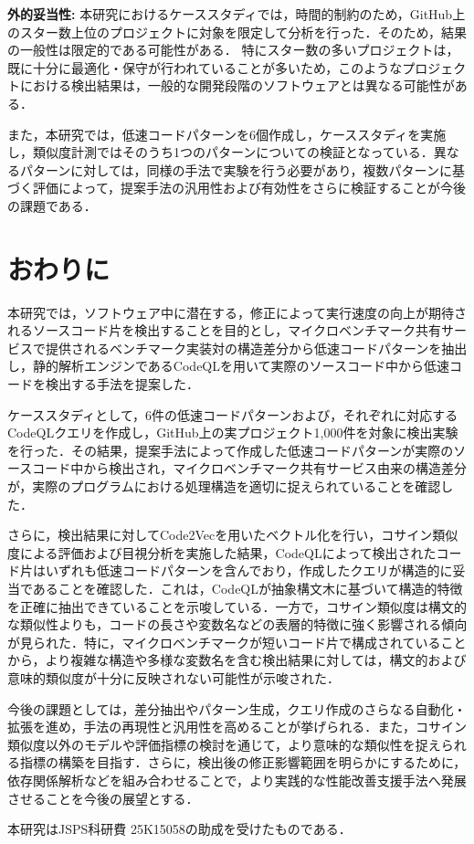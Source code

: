 \documentclass[submit,techrep,noauthor]{ipsj}
\begin{document}
\noindent\textbf{外的妥当性: }
本研究におけるケーススタディでは，時間的制約のため，GitHub上のスター数上位のプロジェクトに対象を限定して分析を行った．そのため，結果の一般性は限定的である可能性がある．
特にスター数の多いプロジェクトは，既に十分に最適化・保守が行われていることが多いため，このようなプロジェクトにおける検出結果は，一般的な開発段階のソフトウェアとは異なる可能性がある．

また，本研究では，低速コードパターンを6個作成し，ケーススタディを実施し，類似度計測ではそのうち1つのパターンについての検証となっている．異なるパターンに対しては，同様の手法で実験を行う必要があり，複数パターンに基づく評価によって，提案手法の汎用性および有効性をさらに検証することが今後の課題である．


\section{おわりに}
\label{sec:summary}

本研究では，ソフトウェア中に潜在する，修正によって実行速度の向上が期待されるソースコード片を検出することを目的とし，マイクロベンチマーク共有サービスで提供されるベンチマーク実装対の構造差分から低速コードパターンを抽出し，静的解析エンジンであるCodeQLを用いて実際のソースコード中から低速コードを検出する手法を提案した．

ケーススタディとして，6件の低速コードパターンおよび，それぞれに対応するCodeQLクエリを作成し，GitHub上の実プロジェクト1,000件を対象に検出実験を行った．その結果，提案手法によって作成した低速コードパターンが実際のソースコード中から検出され，マイクロベンチマーク共有サービス由来の構造差分が，実際のプログラムにおける処理構造を適切に捉えられていることを確認した．

さらに，検出結果に対してCode2Vecを用いたベクトル化を行い，コサイン類似度による評価および目視分析を実施した結果，CodeQLによって検出されたコード片はいずれも低速コードパターンを含んでおり，作成したクエリが構造的に妥当であることを確認した．これは，CodeQLが抽象構文木に基づいて構造的特徴を正確に抽出できていることを示唆している．一方で，コサイン類似度は構文的な類似性よりも，コードの長さや変数名などの表層的特徴に強く影響される傾向が見られた．特に，マイクロベンチマークが短いコード片で構成されていることから，より複雑な構造や多様な変数名を含む検出結果に対しては，構文的および意味的類似度が十分に反映されない可能性が示唆された．

今後の課題としては，差分抽出やパターン生成，クエリ作成のさらなる自動化・拡張を進め，手法の再現性と汎用性を高めることが挙げられる．また，コサイン類似度以外のモデルや評価指標の検討を通じて，より意味的な類似性を捉えられる指標の構築を目指す．さらに，検出後の修正影響範囲を明らかにするために，依存関係解析などを組み合わせることで，より実践的な性能改善支援手法へ発展させることを今後の展望とする．

\begin{acknowledgment}
本研究はJSPS科研費 25K15058の助成を受けたものである．
\end{acknowledgment}





\end{document}
